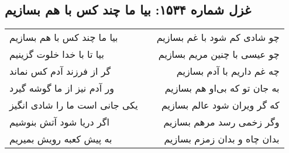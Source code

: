 \begin{center}
\section*{غزل شماره ۱۵۳۴: بیا ما چند کس با هم بسازیم}
\label{sec:1534}
\begin{longtable}{l p{0.5cm} r}
بیا ما چند کس با هم بسازیم
&&
چو شادی کم شود با غم بسازیم
\\
بیا تا با خدا خلوت گزینیم
&&
چو عیسی با چنین مریم بسازیم
\\
گر از فرزند آدم کس نماند
&&
چه غم داریم با آدم بسازیم
\\
ور آدم نیز از ما گوشه گیرد
&&
به جان تو که بی‌او هم بسازیم
\\
یکی جانی است ما را شادی انگیز
&&
که گر ویران شود عالم بسازیم
\\
اگر دریا شود آتش بنوشیم
&&
وگر زخمی رسد مرهم بسازیم
\\
به پیش کعبه رویش بمیریم
&&
بدان چاه و بدان زمزم بسازیم
\\
\end{longtable}
\end{center}
